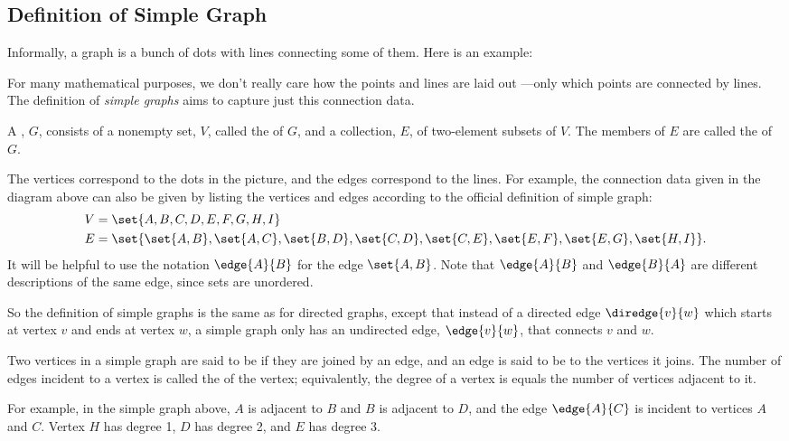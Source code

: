 \label{degreessec}

\subsection{Definition of Simple Graph}
Informally, a graph is a bunch of dots with lines connecting some of
them.  Here is an example:


For many mathematical purposes, we don't really care how the points and
lines are laid out ---only which points are connected by lines.  The
definition of \emph{simple graphs} aims to capture just this connection
data.

\begin{definition}\label{graphdef} 
A , $G$, consists of a nonempty set, $V$, called the
 of $G$, and a collection, $E$, of two-element subsets of
$V$.  The members of $E$ are called the  of $G$.
\end{definition}
The vertices correspond to the dots in the picture, and the edges
correspond to the lines.  For example, the connection data given in the
diagram above can also be given by listing the vertices and edges according
to the official definition of simple graph:
\begin{align*}
V & =  \set{A, B, C, D, E, F, G, H, I} \\
E & =  \set{ \set{A, B}, \set{A, C}, \set{B, D}, \set{C, D},
              \set{C, E}, \set{E, F}, \set{E, G}, \set{H, I} }.
\end{align*}          
It will be helpful to use the notation $\edge{A}{B}$ for the edge
$\set{A,B}$.  Note that $\edge{A}{B}$ and $\edge{B}{A}$ are different
descriptions of the same edge, since sets are unordered.

So the definition of simple graphs is the same as for directed graphs,
except that instead of a directed edge $\diredge{v}{w}$ which starts
at vertex $v$ and ends at vertex $w$, a simple graph only has an
undirected edge, $\edge{v}{w}$, that connects $v$ and $w$.

\begin{definition}
Two vertices in a simple graph are said to be  if they are
joined by an edge, and an edge is said to be  to the
vertices it joins.  The number of edges incident to a vertex is called the
 of the vertex; equivalently, the degree of a vertex is
equals the number of vertices adjacent to it.
\end{definition}
For example, in the simple graph above, $A$ is adjacent to $B$ and $B$ is
adjacent to $D$, and the edge $\edge{A}{C}$ is incident to vertices $A$
and $C$.  Vertex $H$ has degree 1, $D$ has degree 2, and $E$ has degree 3.


